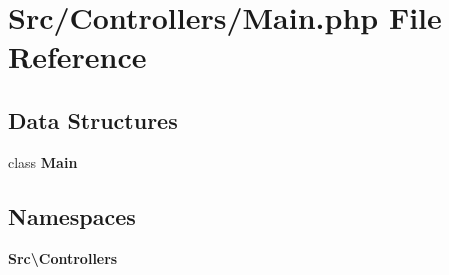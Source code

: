 \section{Src/\+Controllers/\+Main.php File Reference}
\label{_main_8php}
\subsection*{Data Structures}
\begin{DoxyCompactItemize}
\item 
class \textbf{ Main}
\end{DoxyCompactItemize}
\subsection*{Namespaces}
\begin{DoxyCompactItemize}
\item 
 \textbf{ Src\textbackslash{}\+Controllers}
\end{DoxyCompactItemize}
